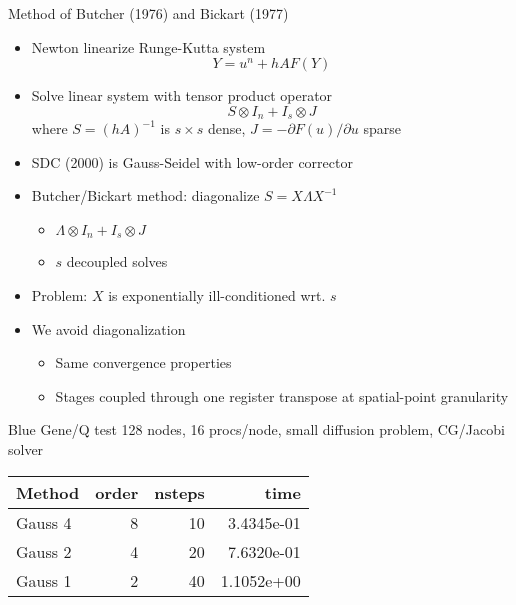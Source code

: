 \documentclass{beamer}
\begin{document}
\begin{frame}{Method of Butcher (1976) and Bickart (1977)}
  \begin{itemize}
  \item Newton linearize Runge-Kutta system
    \begin{equation*}
      Y = u^{n} + h A F(Y)
    \end{equation*}
  \item Solve linear system with tensor product operator
    \begin{equation*}
      S \otimes I_n + I_s \otimes J
    \end{equation*}
    where $S = (hA)^{-1}$ is $s\times s$ dense, $J = -\partial F(u)/\partial u$ sparse
  \item SDC (2000) is Gauss-Seidel with low-order corrector
  \item Butcher/Bickart method: diagonalize $S = X \Lambda X^{-1}$
    \begin{itemize}
    \item $\Lambda \otimes I_n + I_s \otimes J$
    \item $s$ decoupled solves
    \end{itemize}
  \item Problem: $X$ is exponentially ill-conditioned wrt. $s$
  \item We avoid diagonalization
    \begin{itemize}
    \item Same convergence properties
    \item Stages coupled through one register transpose at spatial-point granularity
    \end{itemize}
  \end{itemize}
\end{frame}

\begin{frame}{Blue Gene/Q test}
  128 nodes, 16 procs/node, small diffusion problem, CG/Jacobi solver
  \begin{tabular}{lrrr}
    \toprule
    Method & order & nsteps & time \\
    \midrule
    Gauss 4 & 8 & 10 & 3.4345e-01 \\
    Gauss 2 & 4 & 20 & 7.6320e-01 \\
    Gauss 1 & 2 & 40 & 1.1052e+00 \\
    \bottomrule
  \end{tabular}
\end{frame}
\end{document}
